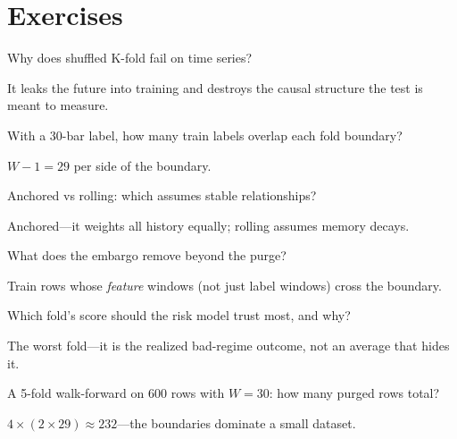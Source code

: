 \section{Exercises}
\begin{exercise}[easy]
Why does shuffled K-fold fail on time series?
\end{exercise}
\begin{solution}
It leaks the future into training and destroys the causal structure the test is meant
to measure.
\end{solution}

\begin{exercise}[easy]
With a 30-bar label, how many train labels overlap each fold boundary?
\end{exercise}
\begin{solution}
$W-1=29$ per side of the boundary.
\end{solution}

\begin{exercise}[easy]
Anchored vs rolling: which assumes stable relationships?
\end{exercise}
\begin{solution}
Anchored---it weights all history equally; rolling assumes memory decays.
\end{solution}

\begin{exercise}[easy]
What does the embargo remove beyond the purge?
\end{exercise}
\begin{solution}
Train rows whose \emph{feature} windows (not just label windows) cross the boundary.
\end{solution}

\begin{exercise}[easy]
Which fold's score should the risk model trust most, and why?
\end{exercise}
\begin{solution}
The worst fold---it is the realized bad-regime outcome, not an average that hides it.
\end{solution}

\begin{exercise}
A 5-fold walk-forward on 600 rows with $W{=}30$: how many purged rows total?
\end{exercise}
\begin{solution}
$4\times(2\times 29)\approx 232$---the boundaries dominate a small dataset.
\end{solution}

